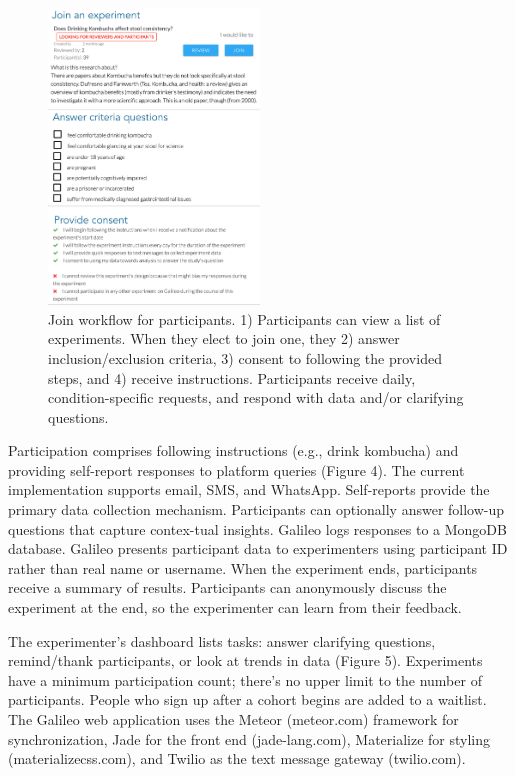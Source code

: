 \begin{figure}
  \centering
  \includegraphics[width=0.5\textwidth]{figures/galileo/galileo-2-run}
  \caption[Join workflow for participants]
{Join workflow for participants. 1) Participants can view a list of experiments. When they elect to join one, they 2) answer inclusion/exclusion criteria, 3) consent to following the provided steps, and 4) receive instructions. Participants receive daily, condition-specific requests, and respond with data and/or clarifying questions. }
  \label{fig:galileo-2-run}
\end{figure}

Participation comprises following instructions (e.g., drink kombucha) and providing self-report responses to platform queries (Figure 4). The current implementation supports email, SMS, and WhatsApp. Self-reports provide the primary data collection mechanism. Participants can optionally answer follow-up questions that capture contex-tual insights. Galileo logs responses to a MongoDB database. Galileo presents participant data to experimenters using participant ID rather than real name or username. When the experiment ends, participants receive a summary of results. Participants can anonymously discuss the experiment at the end, so the experimenter can learn from their feedback. 

The experimenter’s dashboard lists tasks: answer clarifying questions, remind/thank participants, or look at trends in data (Figure 5). Experiments have a minimum participation count; there’s no upper limit to the number of participants. People who sign up after a cohort begins are added to a waitlist.
The Galileo web application uses the Meteor (meteor.com) framework for synchronization, Jade for the front end (jade-lang.com), Materialize for styling (materializecss.com), and Twilio as the text message gateway (twilio.com).


